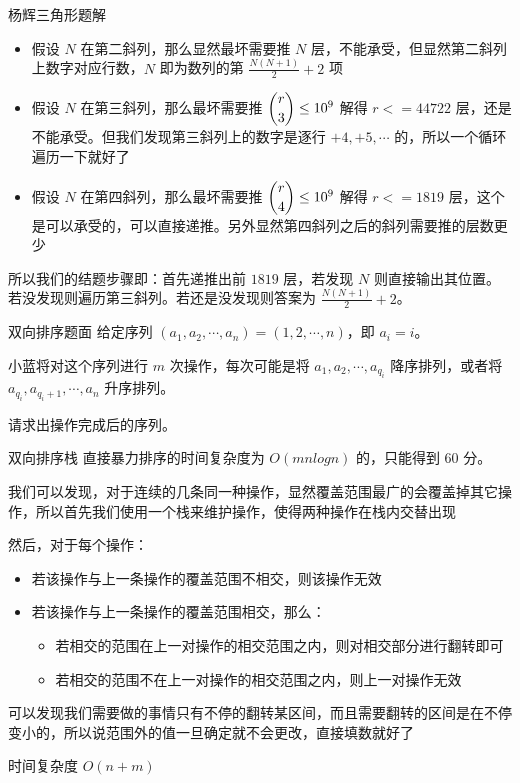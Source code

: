 \documentclass{pptt}
\begin{document}
\begin{frame}{杨辉三角形}{题解}
    \begin{itemize}
        \item 假设 $N$ 在第二斜列，那么显然最坏需要推 $N$ 层，不能承受，但显然第二斜列上数字对应行数，$N$ 即为数列的第 $\frac{N(N+1)}{2}+2$ 项
        \item 假设 $N$ 在第三斜列，那么最坏需要推 $\dbinom{r}{3} \leq {10}^9$ 解得 $r<=44722$ 层，还是不能承受。但我们发现第三斜列上的数字是逐行 $+4,+5,\cdots$ 的，所以一个循环遍历一下就好了
        \item 假设 $N$ 在第四斜列，那么最坏需要推 $\dbinom{r}{4} \leq {10}^9$ 解得 $r<=1819$ 层，这个是可以承受的，可以直接递推。另外显然第四斜列之后的斜列需要推的层数更少
    \end{itemize}

    所以我们的结题步骤即：首先递推出前 $1819$ 层，若发现 $N$ 则直接输出其位置。若没发现则遍历第三斜列。若还是没发现则答案为 $\frac{N(N+1)}{2}+2$。
\end{frame}

\begin{frame}{双向排序}{题面}
    给定序列 $(a_1,a_2,\cdots,a_n) = (1,2,\cdots,n)$，即 $a_i=i$。

    小蓝将对这个序列进行 $m$ 次操作，每次可能是将 $a_1,a_2,\cdots,a_{q_i}$ 降序排列，或者将 $a_{q_i},a_{q_i+1},\cdots,a_n$ 升序排列。

    请求出操作完成后的序列。
\end{frame}

\begin{frame}{双向排序}{栈}
    直接暴力排序的时间复杂度为 $O(mnlogn)$ 的，只能得到 $60$ 分。

    我们可以发现，对于连续的几条同一种操作，显然覆盖范围最广的会覆盖掉其它操作，所以首先我们使用一个栈来维护操作，使得两种操作在栈内交替出现

    然后，对于每个操作：

    \begin{itemize}
        \item 若该操作与上一条操作的覆盖范围不相交，则该操作无效
        \item 若该操作与上一条操作的覆盖范围相交，那么：
              \begin{itemize}
                  \item 若相交的范围在上一对操作的相交范围之内，则对相交部分进行翻转即可
                  \item 若相交的范围不在上一对操作的相交范围之内，则上一对操作无效
              \end{itemize}
    \end{itemize}

    可以发现我们需要做的事情只有不停的翻转某区间，而且需要翻转的区间是在不停变小的，所以说范围外的值一旦确定就不会更改，直接填数就好了

    时间复杂度 $O(n+m)$
\end{frame}
\end{document}

